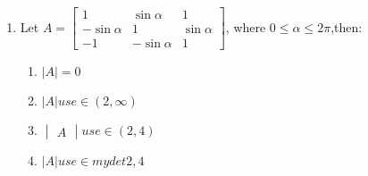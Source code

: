 \documentclass{article}
\newcommand{\myvec}[1]{\begin{bmatrix}#1\end{bmatrix}}
\newcommand{\mydet}[1]{\begin{vmatrix}#1\end{vmatrix}}
\begin{document}
\begin{enumerate}
    \item  Let $A =\myvec{1 & \sin\alpha & 1\\-\sin\alpha & 1 & \sin\alpha\\-1 & -\sin\alpha & 1}$, where $0 \leq \alpha \leq2\pi$,then: 
    \begin{enumerate}
        \item $|A|=0$
        \item $|A| use\in (2,\infty)$
        \item $\mydet{A} use\in (2,4)$
	\item $|A| use\in mydet{2,4}$
    \end{enumerate}
    
\end{enumerate}
\end{document}

